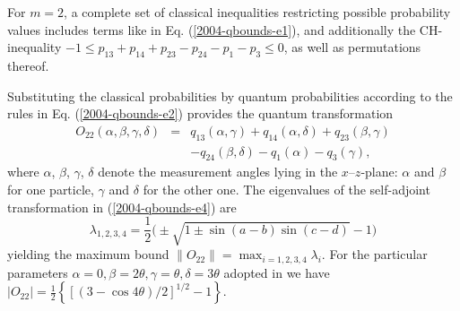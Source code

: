 \documentclass[prl,showpacs,showkeys,amsfonts,amsmath,twocolumn]{revtex4}
\begin{document}
For $m=2$, a complete
set of classical inequalities restricting possible probability values includes terms
like in Eq. (\ref{2004-qbounds-e1}),
and additionally the CH-inequality
$-1 \leq p_{13} + p_{14} + p_{23} - p_{24}- p_{1} -p_{3} \leq 0$, as well as permutations thereof.

Substituting
the classical probabilities by quantum probabilities according to the
rules in Eq. (\ref{2004-qbounds-e2}) provides the quantum
transformation
\begin{eqnarray}
O_{22}(\alpha,\beta,\gamma,\delta)&=&  q_{13}(\alpha,\gamma) +
q_{14}(\alpha,\delta) + q_{23}(\beta,\gamma) \nonumber\\
&&  - q_{24}(\beta,\delta)- q_{1}(\alpha) - q_{3}(\gamma),
\label{2004-qbounds-e4}
\end{eqnarray}
where $\alpha$, $\beta$, $\gamma$, $\delta$ denote the measurement angles
lying in the $x$--$z$-plane: $\alpha$ and $\beta$ for one particle, $\gamma$ and
$\delta$ for the other one.
The eigenvalues of the self-adjoint transformation in
(\ref{2004-qbounds-e4}) are
\begin{equation}
  \label{eq:2004-qbounds-evo22}
  \lambda_{1,2,3,4}=\frac{1}{2}\big(\pm\sqrt{1\pm\sin(a-b)\sin(c-d)}-1\big)
\end{equation}
yielding the maximum bound
$\|O_{22} \|= \max_{i=1,2,3,4} \lambda_i$. For the particular parameters
$\alpha=0,\beta=2\theta,\gamma=\theta,\delta=3\theta$ adopted in
\cite{cabello-2003a,filipp-svo-04-qpoly} we have $|O_{22}|=
\frac{1}{2}\left\{\left[ \left(3-\cos 4\theta \right)/2\right]^{1/2}
  -1\right\}$.
\end{document}
